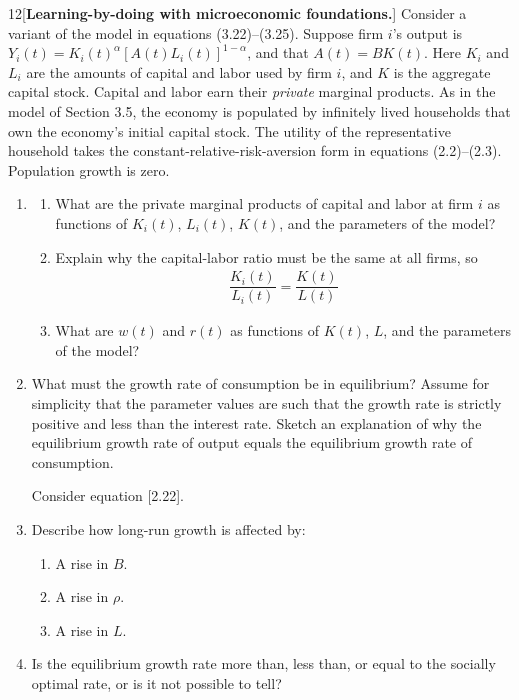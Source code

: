 \begin{problem}{12}[\textbf{Learning-by-doing with microeconomic foundations.}]
Consider a variant of the model in equations (3.22)--(3.25). Suppose firm \(i\)'s output is \(Y_i\left(t\right)=K_i\left(t\right)^\alpha\left[A\left(t\right)L_i\left(t\right)\right]^{1-\alpha}\), and that \(A\left(t\right)=BK\left(t\right)\). Here \(K_i\) and \(L_i\) are the amounts of capital and labor used by firm \(i\), and \(K\) is the aggregate capital stock. Capital and labor earn their \emph{private} marginal products. As in the model of Section 3.5, the economy is populated by infinitely lived households that own the economy's initial capital stock. The utility of the representative household takes the constant-relative-risk-aversion form in equations (2.2)--(2.3). Population growth is zero.
\begin{enumerate}[label=(\alph*)]
    \item
    \begin{enumerate}[label=(\roman*)]
        \item What are the private marginal products of capital and labor at firm \(i\) as functions of \(K_i\left(t\right)\), \(L_i\left(t\right)\), \(K\left(t\right)\), and the parameters of the model?
        \item Explain why the capital-labor ratio must be the same at all firms, so
        \begin{align*}
            \dfrac{K_i\left(t\right)}{L_i\left(t\right)}=\dfrac{K\left(t\right)}{L\left(t\right)}
        \end{align*}
        \item What are \(w\left(t\right)\) and \(r\left(t\right)\) as functions of \(K\left(t\right)\), \(L\), and the parameters of the model?
    \end{enumerate}
    \item What must the growth rate of consumption be in equilibrium? Assume for simplicity that the parameter values are such that the growth rate is strictly positive and less than the interest rate. Sketch an explanation of why the equilibrium growth rate of output equals the equilibrium growth rate of consumption.
    \par {} Consider equation [2.22].
    \item Describe how long-run growth is affected by:
    \begin{enumerate}[label=(\roman*)]
        \item A rise in \(B\).
        \item A rise in \(\rho\).
        \item A rise in \(L\).
    \end{enumerate}
    \item Is the equilibrium growth rate more than, less than, or equal to the socially optimal rate, or is it not possible to tell?
\end{enumerate}
\end{problem}

